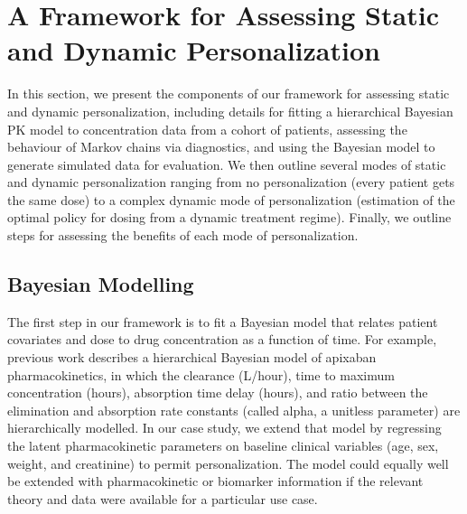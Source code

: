 \section{A Framework for Assessing Static and Dynamic Personalization}\label{ss:framework}

In this section, we present the components of our framework for assessing static and dynamic personalization, including details for fitting a hierarchical Bayesian PK model to concentration data from a cohort of patients, assessing the behaviour of Markov chains via diagnostics, and using the Bayesian model to generate simulated data for evaluation. We then outline several modes of static and dynamic personalization ranging from no personalization (every patient gets the same dose) to a complex dynamic mode of personalization (estimation of the optimal policy for dosing from a dynamic treatment regime).  Finally, we outline steps for assessing the benefits of each mode of personalization.

\subsection{Bayesian Modelling}

The first step in our framework is to fit a Bayesian model that relates patient covariates and dose to drug concentration as a function of time. For example, previous work \cite{pananos2020comparisons} describes a hierarchical Bayesian model of apixaban pharmacokinetics, in which the clearance (L/hour), time to maximum concentration (hours), absorption time delay (hours), and ratio between the elimination and absorption rate constants (called alpha, a unitless parameter) are hierarchically modelled. In our case study, we extend that model by regressing the latent pharmacokinetic parameters on baseline clinical variables (age, sex, weight, and creatinine) to permit personalization. The model could equally well be extended with pharmacokinetic or biomarker information if the relevant theory and data were available for a particular use case.

